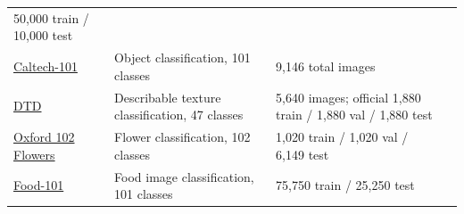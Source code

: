 \begin{table}[ht]
\begin{center}
{\begin{tabular}{llll}
  50{,}000 train / 10{,}000 test \\
\href{http://www.vision.caltech.edu/Image_Datasets/Caltech101/}{Caltech-101} &
  Object classification, 101 classes &
  9{,}146 total images \\
\href{https://www.robots.ox.ac.uk/~vgg/data/dtd/}{DTD} &
  Describable texture classification, 47 classes &
  5{,}640 images; official 1{,}880 train / 1{,}880 val / 1{,}880 test \\
\href{https://www.robots.ox.ac.uk/~vgg/data/flowers/102/}{Oxford 102 Flowers} &
  Flower classification, 102 classes &
  1{,}020 train / 1{,}020 val / 6{,}149 test \\
\href{https://data.vision.ee.ethz.ch/cvl/datasets_extra/food-101/}{Food-101} &
  Food image classification, 101 classes &
  75{,}750 train / 25{,}250 test \\
\bottomrule
\end{tabular}%
}
\end{center}
\end{table}